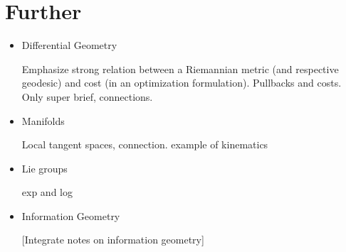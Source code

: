 \section{Further}

\begin{itemize}
\item Differential Geometry

Emphasize strong relation between a Riemannian metric (and respective geodesic) and cost (in an optimization formulation). Pullbacks and costs. Only super brief, connections.

\item Manifolds

Local tangent spaces, connection. example of kinematics

\item Lie groups

exp and log

\item Information Geometry

[Integrate notes on information geometry]

\end{itemize}







